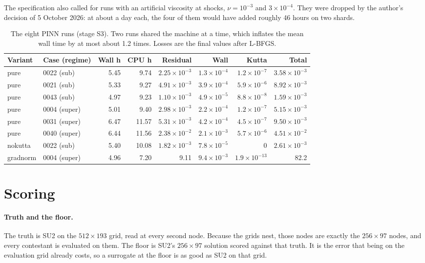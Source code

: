 \documentclass[11pt]{article}
\begin{document}
The specification also called for runs with an artificial viscosity at shocks, $\nu = 10^{-3}$ and
$3\times10^{-4}$. They were dropped by the author's decision of 5 October 2026: at about a day each,
the four of them would have added roughly 46 hours on two shards.

\begin{table}[t]
\centering\small
\caption{The eight PINN runs (stage S3). Two runs shared the machine at a time, which inflates the
mean wall time by at most about 1.2 times. Losses are the final values after L-BFGS.}
\label{tab:pinnruns}
\begin{tabular}{@{}llrrrrrr@{}}
\toprule
Variant & Case (regime) & Wall h & CPU h & Residual & Wall & Kutta & Total\\
\midrule
pure & 0022 (sub) & 5.45 & 9.74 & $2.25\times10^{-3}$ & $1.3\times10^{-4}$ & $1.2\times10^{-7}$ & $3.58\times10^{-3}$\\
pure & 0021 (sub) & 5.33 & 9.27 & $4.91\times10^{-3}$ & $3.9\times10^{-4}$ & $5.9\times10^{-6}$ & $8.92\times10^{-3}$\\
pure & 0043 (sub) & 4.97 & 9.23 & $1.10\times10^{-3}$ & $4.9\times10^{-5}$ & $8.8\times10^{-8}$ & $1.59\times10^{-3}$\\
pure & 0004 (super) & 5.01 & 9.40 & $2.98\times10^{-3}$ & $2.2\times10^{-4}$ & $1.2\times10^{-7}$ & $5.15\times10^{-3}$\\
pure & 0031 (super) & 6.47 & 11.57 & $5.31\times10^{-3}$ & $4.2\times10^{-4}$ & $4.5\times10^{-7}$ & $9.50\times10^{-3}$\\
pure & 0040 (super) & 6.44 & 11.56 & $2.38\times10^{-2}$ & $2.1\times10^{-3}$ & $5.7\times10^{-6}$ & $4.51\times10^{-2}$\\
nokutta & 0022 (sub) & 5.40 & 10.08 & $1.82\times10^{-3}$ & $7.8\times10^{-5}$ & 0 & $2.61\times10^{-3}$\\
gradnorm & 0004 (super) & 4.96 & 7.20 & 9.11 & $9.4\times10^{-3}$ & $1.9\times10^{-13}$ & 82.2\\
\bottomrule
\end{tabular}
\end{table}

\section{Scoring}
\label{sec:scoring}

\paragraph{Truth and the floor.}
The truth is SU2 on the $512\times193$ grid, read at every second node. Because the grids nest,
those nodes are exactly the $256\times97$ nodes, and every contestant is evaluated on them. The
floor is SU2's $256\times97$ solution scored against that truth. It is the error that being on the
evaluation grid already costs, so a surrogate at the floor is as good as SU2 on that grid.
\end{document}
